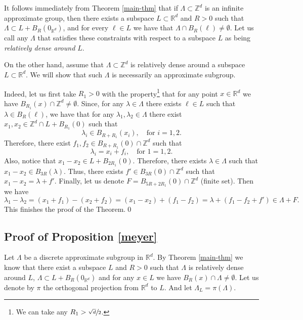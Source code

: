 \documentclass[JEP,XML,SOM,Unicode,NoEqCountersInSection]{cedram}
\newcommand{\bR}{\mathbb{R}}
\newcommand{\bZ}{\mathbb{Z}}
\theoremstyle{plain}
\theoremstyle{definition}
\begin{document}
It follows immediately from Theorem \ref{main-thm} that if \hbox{$\Lambda \subset \bZ^d$} is an infinite approximate group, then there exists a subspace $L \subset \bR^d$ and $R > 0$ such that $\Lambda \subset L + B_R(0_{\bR^d})$, and for every $\ell \in L$ we have that $\Lambda \cap B_R(\ell) \neq \emptyset$. Let us call any $\Lambda$ that satisfies these constraints with respect to a subspace $L$ as being \textit{relatively dense around $L$}.

On the other hand, assume that $\Lambda \subset \bZ^d$ is relatively dense around a subspace $L \subset \bR^d$. We will show that such $\Lambda$ is necessarily an approximate subgroup.

Indeed, let us first take $R_1 > 0$ with the property\footnote{We can take any $R_1 >\sfrac{\sqrt{d}}{2}$.} that
for any point $x \in \bR^d$ we have $B_{R_1}(x) \cap \bZ^d \neq \emptyset$. Since, for any $\lambda \in \Lambda$ there exists $\ell \in L$ such that $\lambda \in B_R(\ell)$, we have that for any $\lambda_1,\lambda_2 \in \Lambda$ there exist
$x_1,x_2 \in \bZ^d \cap L+B_{R_1}(0)$ such that
\[
\lambda_i \in B_{R+R_1}(x_i), \quad\text{for } i = 1,2.
\]
Therefore, there exist $f_1,f_2 \in B_{R+R_1}(0) \cap \bZ^d$ such that
\[
\lambda_i = x_i + f_i, \quad\text{for } 1 = 1,2.
\]
Also, notice that $x_1 - x_2 \in L + B_{2R_1}(0)$. Therefore, there exists $\lambda \in \Lambda$ such that $x_1 - x_2 \in B_{3R}(\lambda)$. Thus, there exists $f' \in B_{3R}(0) \cap \bZ^{d}$ such that $x_1-x_2 = \lambda + f'$. Finally,
let us denote $F = B_{5R + 2R_1}(0) \cap \bZ^d$ (finite set). Then we have
\[
\lambda_1 - \lambda_2 = (x_1 + f_1) - (x_2 + f_2) = (x_1 - x_2) + (f_1 - f_2) = \lambda + (f_1 - f_2 + f') \in \Lambda + F.
\]
This finishes the proof of the Theorem.\qed

\subsection{Proof of Proposition \ref{meyer}}

Let $\Lambda$ be a discrete approximate subgroup in $\bR^d$. By Theorem \ref{main-thm} we know that there exist a subspace $L$ and $R > 0$ such that $\Lambda$ is relatively dense around $L$, \ie $\Lambda \subset L + B_R(0_{\bR^d})$ and for any $x \in L$ we have $B_R(x) \cap \Lambda \neq \emptyset$. Let us denote by $\pi$ the orthogonal projection from $\bR^d$ to $L$. And let $\Lambda_L = \pi(\Lambda)$.
\end{document}

